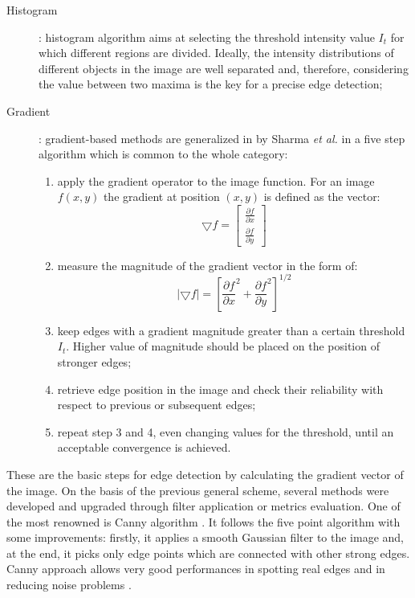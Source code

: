 \documentclass[../main.tex]{subfiles}
\begin{document}
\begin{description}
\item[Histogram] : histogram algorithm aims at selecting the threshold intensity value $I_{t}$ for which different regions are divided. Ideally, the intensity distributions of different objects in the image are well separated and, therefore, considering the value between two maxima is the key for a precise edge detection; 
\item[Gradient] : gradient-based methods are generalized in \cite{automated_segm_tech} by Sharma \textit{et al.} in a five step algorithm which is common to the whole category:
          \begin{enumerate}
               \item apply the gradient operator to the image function.
               For an image $f(x,y)$ the gradient at position $(x,y)$ is defined as the vector:
               \begin{equation}
               \bigtriangledown f = \begin{bmatrix}
                                            \frac{\partial f}{\partial x} \\
                                            \frac{\partial f}{\partial y}
                                        \end{bmatrix}
               \end{equation}
               \item measure the magnitude of the gradient vector in the form of:
               \begin{equation}
                     |\bigtriangledown f| = \left[ \frac{\partial f}{\partial x}^{2} + \frac{\partial f}{\partial y}^{2} \right]^{1/2}
               \end{equation}
               \item keep edges with a gradient magnitude greater than a certain threshold $I_{t}$. 
               Higher value of magnitude should be placed on the position of stronger edges;
               \item retrieve edge position in the image and check their reliability with respect to previous or subsequent edges;
               \item repeat step 3 and 4, even changing values for the threshold, until an acceptable convergence is achieved.
           \end{enumerate}
\end{description}
These are the basic steps for edge detection by calculating the gradient vector of the image. 
On the basis of the previous general scheme, several methods were developed and upgraded through filter application or metrics evaluation.
One of the most renowned is Canny algorithm \cite{Canny}. 
It follows the five point algorithm with some improvements: firstly, it applies a  smooth Gaussian filter to the image and, at the end, it picks only edge points which are connected with other strong edges. 
Canny approach allows very good performances in spotting real edges and in reducing noise problems \cite{saif2016gradient}.
\end{document}
